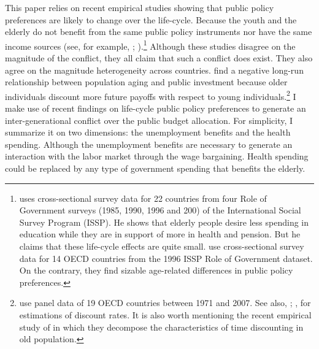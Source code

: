 This paper relies on recent empirical studies showing that public policy preferences are likely to change over the life-cycle. Because the youth and the elderly do not benefit from the same public policy instruments nor have the same income sources (see, for example, \citealt{Busemeyer2009}; \citealt{Sorensen2013}).\footnote{\cite{Sorensen2013} uses cross-sectional survey data for 22 countries from four Role of Government surveys (1985, 1990, 1996 and 200) of the International Social Survey Program (ISSP). He shows that elderly people desire less spending in education while they are in support of more in health and pension. But he claims that these life-cycle effects are quite small. \cite{Busemeyer2009} use cross-sectional survey data for 14 OECD countries from the 1996 ISSP Role of Government dataset. On the contrary, they find sizable age-related differences in public policy preferences.} Although these studies disagree on the magnitude of the conflict, they all claim that such a conflict does exist. They also agree on the magnitude heterogeneity across countries. \cite{Jager2016} find a negative long-run relationship between population aging and public investment because older individuals discount more future payoffs with respect to young individuals.\footnote{\cite{Jager2016} use panel data of 19 OECD countries between 1971 and 2007. See also, \cite{Harrison2002}; \cite{Read2004}, for estimations of discount rates. It is also worth mentioning the recent empirical study of \cite{Huffman2017} in which they decompose the characteristics of time discounting in old population.} 
I make use of recent findings on life-cycle public policy preferences to generate an inter-generational conflict over the public budget allocation. For simplicity, I summarize it on two dimensions: the unemployment benefits and the health spending. Although the unemployment benefits are necessary to generate an interaction with the labor market through the wage bargaining. Health spending could be replaced by any type of government spending that benefits the elderly.

